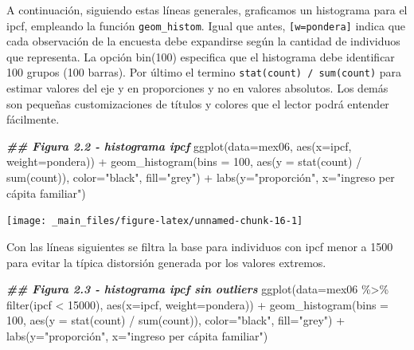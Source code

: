 \documentclass[
]{book}
\newenvironment{Shaded}{\begin{snugshade}}{\end{snugshade}}
\newcommand{\AttributeTok}[1]{\textcolor[rgb]{0.77,0.63,0.00}{#1}}
\newcommand{\DecValTok}[1]{\textcolor[rgb]{0.00,0.00,0.81}{#1}}
\newcommand{\DocumentationTok}[1]{\textcolor[rgb]{0.56,0.35,0.01}{\textbf{\textit{#1}}}}
\newcommand{\FunctionTok}[1]{\textcolor[rgb]{0.00,0.00,0.00}{#1}}
\newcommand{\NormalTok}[1]{#1}
\newcommand{\SpecialCharTok}[1]{\textcolor[rgb]{0.00,0.00,0.00}{#1}}
\newcommand{\StringTok}[1]{\textcolor[rgb]{0.31,0.60,0.02}{#1}}
\begin{document}
A continuación, siguiendo estas líneas generales, graficamos un histograma para el ipcf, empleando la función \texttt{geom\_histom}. Igual que antes, \texttt{{[}w=pondera{]}} indica que cada observación de la encuesta debe expandirse según la cantidad de individuos que representa. La opción bin(100) especifica que el histograma debe identificar 100 grupos (100 barras). Por último el termino \texttt{stat(count)\ /\ sum(count)} para estimar valores del eje y en proporciones y no en valores absolutos. Los demás son pequeñas customizaciones de títulos y colores que el lector podrá entender fácilmente.

\begin{Shaded}
\begin{Highlighting}[]
\DocumentationTok{\#\# Figura 2.2 {-} histograma ipcf}
\FunctionTok{ggplot}\NormalTok{(}\AttributeTok{data=}\NormalTok{mex06, }
       \FunctionTok{aes}\NormalTok{(}\AttributeTok{x=}\NormalTok{ipcf, }\AttributeTok{weight=}\NormalTok{pondera)) }\SpecialCharTok{+} 
  \FunctionTok{geom\_histogram}\NormalTok{(}\AttributeTok{bins =} \DecValTok{100}\NormalTok{, }\FunctionTok{aes}\NormalTok{(}\AttributeTok{y =} \FunctionTok{stat}\NormalTok{(count) }\SpecialCharTok{/} \FunctionTok{sum}\NormalTok{(count)),}
                 \AttributeTok{color=}\StringTok{"black"}\NormalTok{, }\AttributeTok{fill=}\StringTok{"grey"}\NormalTok{) }\SpecialCharTok{+}
    \FunctionTok{labs}\NormalTok{(}\AttributeTok{y=}\StringTok{"proporción"}\NormalTok{, }\AttributeTok{x=}\StringTok{"ingreso per cápita familiar"}\NormalTok{)}
\end{Highlighting}
\end{Shaded}

\texttt{[image: \_main\_files/figure-latex/unnamed-chunk-16-1]}

Con las líneas siguientes se filtra la base para individuos con ipcf menor a 1500 para evitar la típica distorsión generada por los valores extremos.

\begin{Shaded}
\begin{Highlighting}[]
\DocumentationTok{\#\# Figura 2.3 {-} histograma ipcf sin outliers}
\FunctionTok{ggplot}\NormalTok{(}\AttributeTok{data=}\NormalTok{mex06 }\SpecialCharTok{\%\textgreater{}\%} \FunctionTok{filter}\NormalTok{(ipcf }\SpecialCharTok{\textless{}} \DecValTok{15000}\NormalTok{), }
       \FunctionTok{aes}\NormalTok{(}\AttributeTok{x=}\NormalTok{ipcf, }\AttributeTok{weight=}\NormalTok{pondera)) }\SpecialCharTok{+} 
  \FunctionTok{geom\_histogram}\NormalTok{(}\AttributeTok{bins =} \DecValTok{100}\NormalTok{, }\FunctionTok{aes}\NormalTok{(}\AttributeTok{y =} \FunctionTok{stat}\NormalTok{(count) }\SpecialCharTok{/} \FunctionTok{sum}\NormalTok{(count)),}
                 \AttributeTok{color=}\StringTok{"black"}\NormalTok{, }\AttributeTok{fill=}\StringTok{"grey"}\NormalTok{) }\SpecialCharTok{+}
    \FunctionTok{labs}\NormalTok{(}\AttributeTok{y=}\StringTok{"proporción"}\NormalTok{, }\AttributeTok{x=}\StringTok{"ingreso per cápita familiar"}\NormalTok{)}
\end{Highlighting}
\end{Shaded}
\end{document}
